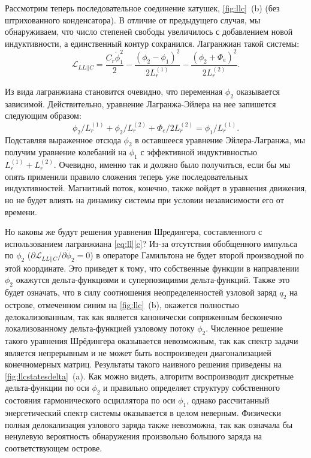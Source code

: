 \documentclass[14pt, a4paper]{extreport}
\numberwithin{equation}{section}
\begin{document}
Рассмотрим теперь последовательное соединение катушек, \autoref{fig:llc}~(b) (без штрихованного конденсатора). В отличие от предыдущего случая, мы обнаруживаем, что число степеней свободы увеличилось с добавлением новой индуктивности, а единственный контур сохранился. Лагранжиан такой системы:
\begin{equation}
	\mathcal{L}_{LL||C} = \frac{C_r \dot\phi_1^2}{2} - \frac{(\phi_2 - \phi_1)^2}{2L_r^{(1)}} - \frac{\left(\phi_2+\Phi_e\right)^2}{2 L_r^{(2)}}.\label{eq:ll||c}
\end{equation}

Из вида лагранжиана становится очевидно, что переменная $\phi_2$ оказывается зависимой. Действительно, уравнение Лагранжа-Эйлера на нее запишется следующим образом:
\begin{equation}
	\phi_2/L_r^{(1)} + \phi_2/L_r^{(2)} + \Phi_e/2L_r^{(2)} = \phi_1/L_r^{(1)}.
\end{equation}
Подставляя выраженное отсюда $\phi_2$ в оставшееся уравнение Эйлера-Лагранжа, мы получим уравнение колебаний на $\phi_1$ с эффективной индуктивностью $L_r^{(1)} + L_r^{(2)}$. Очевидно, именно так и должно было получиться, если бы мы опять применили правило сложения теперь уже последовательных индуктивностей. Магнитный поток, конечно, также войдет в уравнения движения, но не будет влиять на динамику системы при условии независимости его от времени. 

Но каковы же будут решения уравнения Шредингера, составленного с использованием лагранжиана \eqref{eq:ll||c}? Из-за отсутствия обобщенного импульса по $\phi_2$ ($\partial \mathcal{L}_{LL||C}/\partial \dot \phi_2 = 0$) в операторе Гамильтона не будет второй производной по этой координате. Это приведет к тому, что собственные функции в направлении $\phi_2$ окажутся дельта-функциями и суперпозициями дельта-функций. Также это будет означать, что в силу соотношения неопределенностей узловой заряд $q_2$ на острове, отмеченном синим на \autoref{fig:llc}~(b), окажется полностью делокализованным, так как является канонически сопряженным бесконечно локализованному дельта-функцией узловому потоку $\phi_2$. Численное решение такого уравнения Шрёдингера оказывается невозможным, так как спектр задачи является непрерывным и не может быть воспроизведен диагонализацией конечномерных матриц. Результаты такого наивного решения приведены на \autoref{fig:llcstatesdelta}~(a). Как можно видеть, алгоритм воспроизводит дискретные дельта-функции по оси $\phi_2$ и правильно определяет структуру собственного состояния гармонического осциллятора по оси $\phi_1$, однако рассчитанный энергетический спектр системы оказывается в целом неверным. Физически полная делокализация узлового заряда также невозможна, так как означала бы ненулевую вероятность обнаружения произвольно большого заряда на соответствующем острове. 
\end{document}
